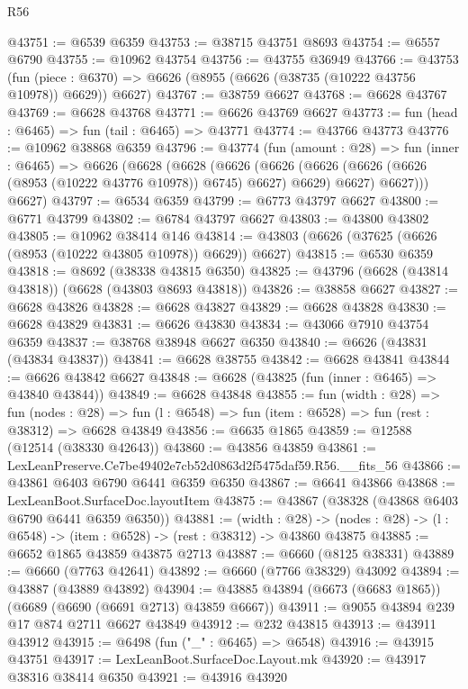 \begin{lexlean}{R56}
\begin{coremodule}
@43751 := @6539 @6359
@43753 := @38715 @43751 @8693
@43754 := @6557 @6790
@43755 := @10962 @43754
@43756 := @43755 @36949
@43766 := @43753
    (fun (piece : @6370) => @6626 (@8955 (@6626 (@38735 (@10222 @43756 @10978)) @6629)) @6627)
@43767 := @38759 @6627
@43768 := @6628 @43767
@43769 := @6628 @43768
@43771 := @6626 @43769 @6627
@43773 := fun (head : @6465) => fun (tail : @6465) => @43771
@43774 := @43766 @43773
@43776 := @10962 @38868 @6359
@43796 := @43774
    (fun (amount : @28) =>
    fun (inner : @6465) =>
    @6626
      (@6628
        (@6628
          (@6626
            (@6626 (@6626 (@6626 (@6626 (@8953 (@10222 @43776 @10978)) @6745) @6627) @6629) @6627)
            @6627)))
      @6627)
@43797 := @6534 @6359
@43799 := @6773 @43797 @6627
@43800 := @6771 @43799
@43802 := @6784 @43797 @6627
@43803 := @43800 @43802
@43805 := @10962 @38414 @146
@43814 := @43803 (@6626 (@37625 (@6626 (@8953 (@10222 @43805 @10978)) @6629)) @6627)
@43815 := @6530 @6359
@43818 := @8692 (@38338 @43815 @6350)
@43825 := @43796 (@6628 (@43814 @43818)) (@6628 (@43803 @8693 @43818))
@43826 := @38858 @6627
@43827 := @6628 @43826
@43828 := @6628 @43827
@43829 := @6628 @43828
@43830 := @6628 @43829
@43831 := @6626 @43830
@43834 := @43066 @7910 @43754 @6359
@43837 := @38768 @38948 @6627 @6350
@43840 := @6626 (@43831 (@43834 @43837))
@43841 := @6628 @38755
@43842 := @6628 @43841
@43844 := @6626 @43842 @6627
@43848 := @6628 (@43825 (fun (inner : @6465) => @43840 @43844))
@43849 := @6628 @43848
@43855 := fun (width : @28) =>
  fun (nodes : @28) => fun (l : @6548) => fun (item : @6528) => fun (rest : @38312) => @6628 @43849
@43856 := @6635 @1865
@43859 := @12588 (@12514 (@38330 @42643))
@43860 := @43856 @43859
@43861 := LexLeanPreserve.Ce7be49402e7cb52d0863d2f5475daf59.R56.__fits_56
@43866 := @43861 @6403 @6790 @6441 @6359 @6350
@43867 := @6641 @43866
@43868 := LexLeanBoot.SurfaceDoc.layoutItem
@43875 := @43867 (@38328 (@43868 @6403 @6790 @6441 @6359 @6350))
@43881 := (width : @28) ->
  (nodes : @28) -> (l : @6548) -> (item : @6528) -> (rest : @38312) -> @43860 @43875
@43885 := @6652 @1865 @43859 @43875 @2713
@43887 := @6660 (@8125 @38331)
@43889 := @6660 (@7763 @42641)
@43892 := @6660 (@7766 @38329) @43092
@43894 := @43887 (@43889 @43892)
@43904 := @43885 @43894 (@6673 (@6683 @1865)) (@6689 (@6690 (@6691 @2713) @43859 @6667))
@43911 := @9055 @43894 @239 @17 @874 @2711 @6627 @43849
@43912 := @232 @43815
@43913 := @43911 @43912
@43915 := @6498 (fun ("_" : @6465) => @6548)
@43916 := @43915 @43751
@43917 := LexLeanBoot.SurfaceDoc.Layout.mk
@43920 := @43917 @38316 @38414 @6350
@43921 := @43916 @43920

\end{coremodule}
\end{lexlean}

